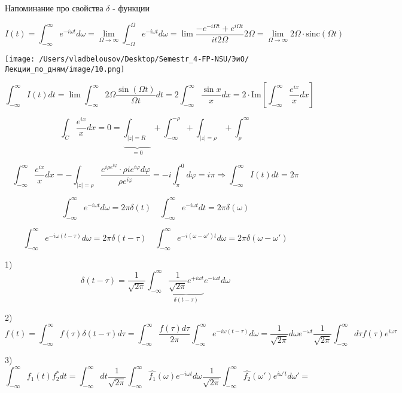 \documentclass[12pt, a4paper]{report}
\begin{document}
Напоминание про свойства \( \delta \) - функции

\[ I(t)= \int_{-\infty}^{\infty} e^{- i \omega t} d \omega = \lim_{\Omega \to \infty} \int_{-\Omega}^{\Omega}e^{- i \omega t} d \omega  = \lim \frac{-e^{-i \Omega t} + e^{i \Omega t}}{it 2 \Omega}  2 \Omega = \lim_{\Omega \to \infty}   2 \Omega  \cdot\mathrm{sinc}(\Omega t)    \] 

\begin{center}
    \texttt{[image: /Users/vladbelousov/Desktop/Semestr\_4-FP-NSU/ЭиО/Лекции\_по\_дням/image/10.png]}
\end{center}

\[ \int_{-\infty }^{\infty} I (t)dt =\lim \int_{-\infty}^{\infty} 2 \Omega \frac{\sin  ( \Omega t)}{\Omega t}dt = 2 \int_{- \infty }^{\infty} \frac{ \sin x}{x}dx = 2 \cdot \mathrm{Im} \left[ \int_{-\infty }^{\infty} \frac{e^{ix} }{x} dx \right]      \] 

\[ \int_{C} \frac{e^{ix} }{x} dx =0 = \underbrace{\int_{|z|= R}}_{=0}  + \int_{-\infty}^{-\rho} + \int_{|z|= \rho} + \int_{ \rho}^{\infty}       \] 

\[ \int_{-\infty}^{\infty} \frac{e^{ix} }{x} dx = - \int_{|z|=\rho} \frac{e^{i \rho e ^{i \varphi} } \cdot \rho i e^{ i \varphi} d \varphi }{\rho e^{i \varphi}} =- i \int_{\pi}^{0} d \varphi= i \pi \Rightarrow \int_{-\infty }^{\infty} I ( t)dt = 2\pi      \] 

\[ \int_{-\infty }^{\infty}  e^{- i \omega t} d \omega = 2 \pi \delta ( t) \quad \int_{-\infty}^{\infty} e ^{ - i \omega t }dt = 2 \pi \delta(\omega)  \]

\[ \int_{-\infty}^{\infty}   e^{- i \omega( t - \tau)} d \omega = 2 \pi \delta ( t - \tau )\quad  \int_{-\infty}^{\infty}    e^{-i (\omega- \omega ') t} d \omega = 2 \pi \delta ( \omega- \omega' )   \] 

1)\[  \delta ( t- \tau )= \frac{1}{ \sqrt{ 2 \pi }} \int_{-\infty}^{  \infty} \underbrace{\frac{1}{ \sqrt{2\pi }} e^{+i \omega t} }_{\delta ( t - \tau) }e^{- i \omega t} d \omega \] 

2)\[ f(t)= \int_{-\infty}^{\infty} f(\tau ) \delta ( t - \tau)d \tau = \int_{-\infty}^{\infty} \frac{f(\tau)d \tau}{2 \pi} \int_{-\infty}^{\infty} e^{- i \omega ( t - \tau ) }d \omega = \frac{1}{ \sqrt{2 \pi}} d \omega e ^{- \omega t } \frac{1}{\sqrt{2 \pi}} \int_{-\infty}^{\infty} d \tau f( \tau) e^{i \omega \tau}       \] 

3) \[ \int_{-\infty}^{\infty}   f_1 ( t)f_2 ^{*}dt  = \int_{-\infty}^{\infty}   dt \frac{1}{\sqrt{2\pi}}\int_{-\infty}^{\infty} \hat{f_1 }(\omega)e ^{-i \omega t} d \omega \frac{1}{\sqrt{2 \pi}} \int _{-\infty}^{\infty} \hat{f_2 }(\omega') e^{i \omega' t} d \omega'    = \]
\end{document}
